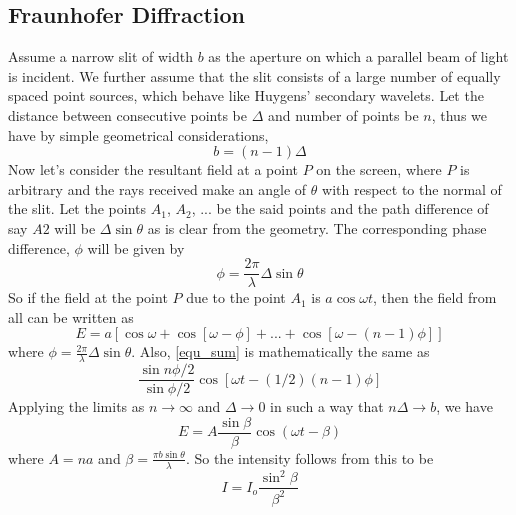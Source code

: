 	\subsection{Fraunhofer Diffraction}
	Assume a narrow slit of width $b$ as the aperture on which a parallel beam of light is incident. We further assume that the slit consists of a large number of equally spaced point sources, which behave like Huygens' secondary wavelets. Let the distance between consecutive points be $\Delta$ and number of points be $n$, thus we have by simple geometrical considerations, 
	\begin{equation}
		b=(n-1)\Delta
	\end{equation}
	Now let's consider the resultant field at a point $P$ on the screen, where $P$ is arbitrary and the rays received make an angle of $\theta$ with respect to the normal of the slit. Let the points $A_1$, $A_2$, ... be the said points and the path difference of say $A2$ will be $\Delta \sin{\theta}$ as is clear from the geometry. The corresponding phase difference, $\phi$ will be given by
	\begin{equation}
		\phi = \frac{2\pi}{\lambda}\Delta \sin{\theta}
	\end{equation}
	So if the field at the point $P$ due to the point $A_1$ is $a\cos{\omega t}$, then the field from all can be written as
	\begin{equation}
		E=a[\cos{\omega} + \cos{[\omega - \phi]} + ... + \cos{[\omega - (n-1)\phi]}]		
		\label{equ_sum}
	\end{equation}
	where $\phi = \frac{2\pi}{\lambda}\Delta \sin{\theta}$.
	Also, \autoref{equ_sum} is mathematically the same as
	\begin{equation}
		\frac{\sin{n\phi /2} }  {\sin {\phi/2}} \cos{[\omega t - (1/2)(n-1)\phi]}
	\end{equation}
	Applying the limits as $n \rightarrow \infty$ and $\Delta \rightarrow 0$ in such a way that $n\Delta \rightarrow b$, we have
	\begin{equation}
		E=A\frac{\sin \beta}{\beta} \cos{(\omega t - \beta)}
	\end{equation}
	where $A=na$ and $\beta=\frac{\pi b\sin{\theta}}{\lambda}$. So the intensity follows from this to be
	\begin{equation}
		I=I_o \frac{\sin^2{\beta}}{\beta^2}
		\label{E3_1}
	\end{equation}

